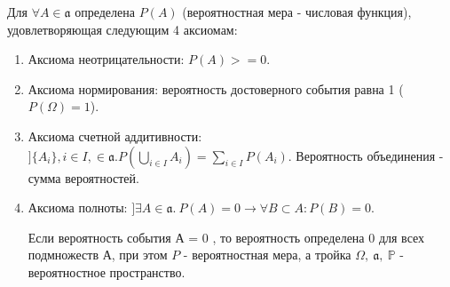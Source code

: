 \documentclass[../Main.tex]{subfiles}
\begin{document}




Для \(\forall A \in \mathfrak{a}\) определена \(P(A)\) (вероятностная мера - числовая функция), удовлетворяющая следующим 4 аксиомам:
\begin{enumerate}
    \item Аксиома неотрицательности: \(P(A) >= 0\).
    \item Аксиома нормирования: вероятность достоверного события равна 1 (\(P(\Omega) = 1\)).
    \item Аксиома счетной аддитивности: \(] \{A_i\}, i \in I, \in \mathfrak{a}. P(\bigcup_{i \in I} A_i) = \underset{i \in I}{\sum} P(A_i)\). Вероятность объединения - сумма вероятностей.
    \item Аксиома полноты: \(] \exists A \in \mathfrak{a}. \ P(A) = 0 \rightarrow \forall B \subset A: P(B) = 0\). 
    
    Если вероятность события А = 0 , то вероятность определена 0 для всех подмножеств А, при этом \(P\) - вероятностная мера, а тройка \(\Omega, \ \mathfrak{a},\ \mathbb{P} \) - вероятностное пространство.
\end{enumerate}

\end{document}
